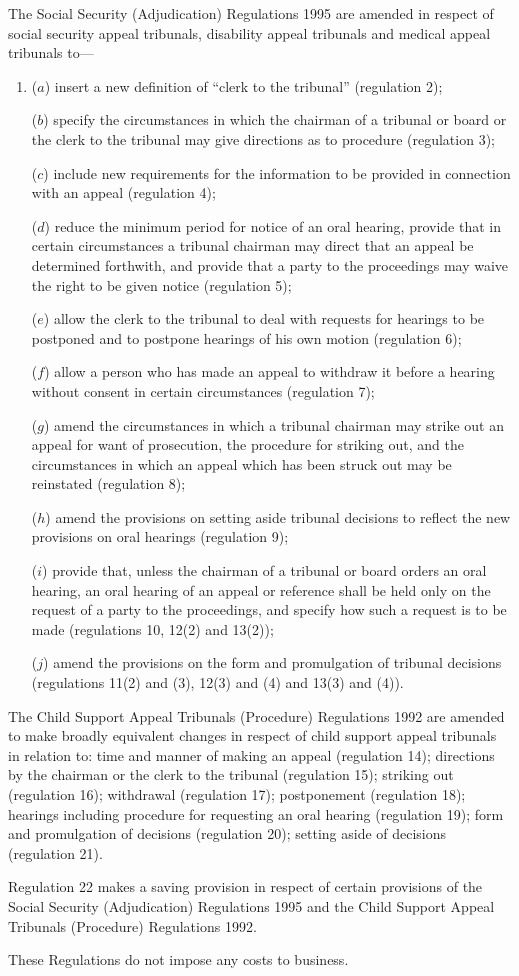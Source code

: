 \documentclass[a4paper]{article}
\begin{document}
 The Social Security (Adjudication) Regulations 1995 are amended in respect of social security appeal tribunals, disability appeal tribunals and medical appeal tribunals to—
\begin{enumerate}\item[]
 ($a$) insert a new definition of “clerk to the tribunal” (regulation 2);

 ($b$) specify the circumstances in which the chairman of a tribunal or board or the clerk to the tribunal may give directions as to procedure (regulation 3);

 ($c$) include new requirements for the information to be provided in connection with an appeal (regulation 4);

 ($d$) reduce the minimum period for notice of an oral hearing, provide that in certain circumstances a tribunal chairman may direct that an appeal be determined forthwith, and provide that a party to the proceedings may waive the right to be given notice (regulation 5);

 ($e$) allow the clerk to the tribunal to deal with requests for hearings to be postponed and to postpone hearings of his own motion (regulation 6);

 ($f$) allow a person who has made an appeal to withdraw it before a hearing without consent in certain circumstances (regulation 7);

 ($g$) amend the circumstances in which a tribunal chairman may strike out an appeal for want of prosecution, the procedure for striking out, and the circumstances in which an appeal which has been struck out may be reinstated (regulation 8);

 ($h$) amend the provisions on setting aside tribunal decisions to reflect the new provisions on oral hearings (regulation 9);

 ($i$) provide that, unless the chairman of a tribunal or board orders an oral hearing, an oral hearing of an appeal or reference shall be held only on the request of a party to the proceedings, and specify how such a request is to be made (regulations 10, 12(2) and 13(2));

 ($j$) amend the provisions on the form and promulgation of tribunal decisions (regulations 11(2) and (3), 12(3) and (4) and 13(3) and (4)).
\end{enumerate}

  The Child Support Appeal Tribunals (Procedure) Regulations 1992 are amended to make broadly equivalent changes in respect of child support appeal tribunals in relation to: time and manner of making an appeal (regulation 14); directions by the chairman or the clerk to the tribunal (regulation 15); striking out (regulation 16); withdrawal (regulation 17); postponement (regulation 18); hearings including procedure for requesting an oral hearing (regulation 19); form and promulgation of decisions (regulation 20); setting aside of decisions (regulation 21).

  Regulation 22 makes a saving provision in respect of certain provisions of the Social Security (Adjudication) Regulations 1995 and the Child Support Appeal Tribunals (Procedure) Regulations 1992.

  These Regulations do not impose any costs to business.
\end{document}
